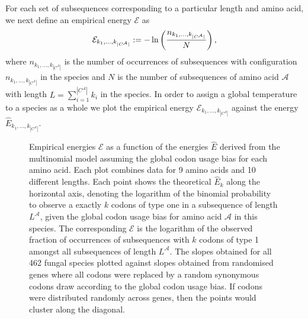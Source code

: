 \documentclass[a4paper,10pt]{paper}%
\begin{document}
For each set of subsequences corresponding to a particular length and amino acid, we next define an empirical energy $\mathcal E$ as
%
% 
\begin{equation}
\mathcal E_{k_1,\ldots, k_{|C^\mathcal A|}} := -\ln\left( {n_{k_1,\ldots, k_{|C^\mathcal A|}}\over N}  \right),
\end{equation}
%
% 
where $n_{k_1,\ldots, k_{|C^\mathcal A|}}$ is the number of occurrences of subsequences with configuration $n_{k_1,\ldots, k_{|C^\mathcal A|}}$ in the species and $N$ is the number of subsequences of amino acid $\mathcal A$  with length $L=\sum_{i=1}^{|C^\mathcal A|} k_i$ in the species. In order to assign a global temperature to a species as a whole we plot the  empirical energy $\mathcal E_{k_1,\ldots, k_{|C^\mathcal A|}}$ against the energy $\hat E_{k_1,\ldots, k_{|C^\mathcal A|}}$. 
% 
%
%
% 
%
%
\begin{figure}
\caption{
\protect{} Empirical energies  $\mathcal E$ as a function of the energies  $\hat E$  derived from the multinomial model  assuming the global codon usage bias for each amino acid. Each plot combines data for 9 amino acids and 10 different lengths. Each point shows the theoretical $\hat E_k$ along the horizontal axis, denoting the logarithm of the binomial probability to observe a exactly $k$ codons of type one in a subsequence of length $L^\mathcal A$, given the global codon usage bias for amino acid $\mathcal A$ in this species.  The corresponding $\mathcal E$ is the logarithm of the observed fraction of occurrences of subsequences with $k$ codons of type 1 amongst all subsequences of length $L^\mathcal A$.  \protect{} The slopes obtained for all 462 fungal species  plotted against  slopes obtained from randomised genes where all codons were replaced by a random synonymous codons draw according to the global codon usage bias. If codons were distributed randomly across genes, then the points would cluster along the diagonal.   }
\label{example1}
\end{figure}
\end{document}
